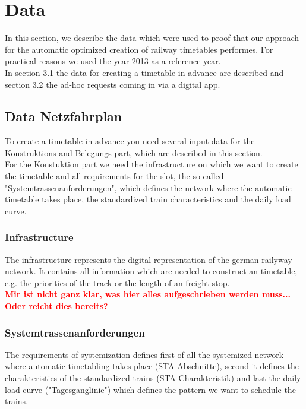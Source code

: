 \section{Data}
\label{chap:data}
In this section, we describe the data which were used to proof that our approach for the automatic optimized creation of railway timetables performes. For practical reasons we used the year 2013 as a reference year.\\
In section 3.1 the data for creating a timetable in advance are described and section 3.2 the ad-hoc requests coming in via a digital app.

\subsection{Data Netzfahrplan}
\label{chap:dataFinVe}
To create a timetable in advance you need several input data for the Konstruktions and Belegungs part, which are described in this section. \\
For the Konstuktion part we need the infrastructure on which we want to create the timetable and all requirements for the slot, the so called "Systemtrassenanforderungen", which defines the network where the automatic timetable takes place, the standardized train characteristics and the daily load curve. 

\subsubsection{Infrastructure}
The infrastructure represents the digital representation of the german railyway network. It contains all information which are needed to construct an timetable, e.g. the priorities of the track or the length of an freight stop.\\
\textbf{\textcolor{red}{Mir ist nicht ganz klar, was hier alles aufgeschrieben werden muss... Oder reicht dies bereits?}}

\subsubsection{Systemtrassenanforderungen}
The requirements of systemization defines first of all the systemized network where automatic timetabling takes place (STA-Abschnitte), second it defines the charakteristics of the standardized trains (STA-Charakteristik) and last the daily load curve ("Tagesganglinie") which defines the pattern we want to schedule the trains.

